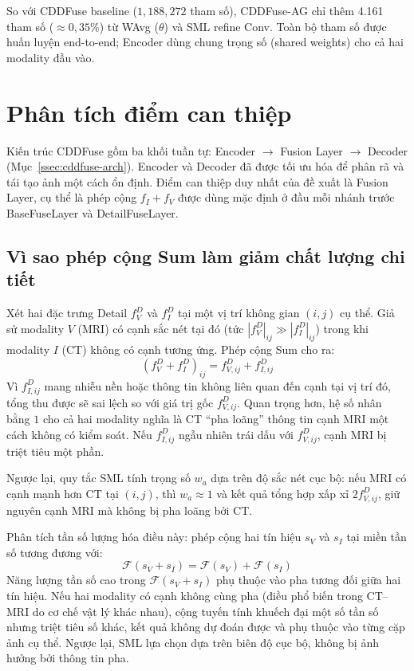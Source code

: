 So với CDDFuse baseline ($1{,}188{,}272$ tham số), CDDFuse-AG chỉ thêm 4.161 tham số ($\approx 0{,}35\%$) từ WAvg ($\theta$) và SML refine Conv. Toàn bộ tham số được huấn luyện end-to-end; Encoder dùng chung trọng số (shared weights) cho cả hai modality đầu vào.

\section{Phân tích điểm can thiệp}
\label{sec:intervention}

Kiến trúc CDDFuse gồm ba khối tuần tự: Encoder $\to$ Fusion Layer $\to$ Decoder (Mục~\ref{ssec:cddfuse-arch}). Encoder và Decoder đã được tối ưu hóa để phân rã và tái tạo ảnh một cách ổn định. Điểm can thiệp duy nhất của đề xuất là Fusion Layer, cụ thể là phép cộng $f_I + f_V$ được dùng mặc định ở đầu mỗi nhánh trước BaseFuseLayer và DetailFuseLayer.

\subsection{Vì sao phép cộng Sum làm giảm chất lượng chi tiết}
\label{ssec:sum-analysis}

Xét hai đặc trưng Detail $f_V^D$ và $f_I^D$ tại một vị trí không gian $(i,j)$ cụ thể. Giả sử modality $V$ (MRI) có cạnh sắc nét tại đó (tức $|f_V^D|_{ij} \gg |f_I^D|_{ij}$) trong khi modality $I$ (CT) không có cạnh tương ứng. Phép cộng Sum cho ra:
\begin{equation}
(f_V^D + f_I^D)_{ij} = f_{V,ij}^D + f_{I,ij}^D
\end{equation}
Vì $f_{I,ij}^D$ mang nhiễu nền hoặc thông tin không liên quan đến cạnh tại vị trí đó, tổng thu được sẽ sai lệch so với giá trị gốc $f_{V,ij}^D$. Quan trọng hơn, hệ số nhân bằng $1$ cho cả hai modality nghĩa là CT ``pha loãng'' thông tin cạnh MRI một cách không có kiểm soát. Nếu $f_{I,ij}^D$ ngẫu nhiên trái dấu với $f_{V,ij}^D$, cạnh MRI bị triệt tiêu một phần.

Ngược lại, quy tắc SML tính trọng số $w_a$ dựa trên độ sắc nét cục bộ: nếu MRI có cạnh mạnh hơn CT tại $(i,j)$, thì $w_a \approx 1$ và kết quả tổng hợp xấp xỉ $2 f_{V,ij}^D$, giữ nguyên cạnh MRI mà không bị pha loãng bởi CT.

Phân tích tần số lượng hóa điều này: phép cộng hai tín hiệu $s_V$ và $s_I$ tại miền tần số tương đương với:
\begin{equation}
\mathcal{F}(s_V + s_I) = \mathcal{F}(s_V) + \mathcal{F}(s_I)
\end{equation}
Năng lượng tần số cao trong $\mathcal{F}(s_V + s_I)$ phụ thuộc vào pha tương đối giữa hai tín hiệu. Nếu hai modality có cạnh không cùng pha (điều phổ biến trong CT--MRI do cơ chế vật lý khác nhau), cộng tuyến tính khuếch đại một số tần số nhưng triệt tiêu số khác, kết quả không dự đoán được và phụ thuộc vào từng cặp ảnh cụ thể. Ngược lại, SML lựa chọn dựa trên biên độ cục bộ, không bị ảnh hưởng bởi thông tin pha.

